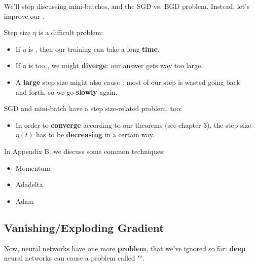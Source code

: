         We'll stop discussing mini-batches, and the SGD vs. BGD problem. Instead, let's improve our .
        
        Step size $\eta$ is a difficult problem:
        
        \begin{itemize}
            \item If $\eta$ is , then our training can take a long \textbf{time}.
            
            \item If $\eta$ is too , we might \textbf{diverge}: our answer gets way too large.
            
            \item A \textbf{large} step size might also cause : most of our step is wasted going back and forth, so we go \textbf{slowly} again.
        \end{itemize}
        
        SGD and mini-batch have a step size-related problem, too:
        
        \begin{itemize}
            \item In order to \textbf{converge} according to our theorems (see chapter 3), the step size $\eta(t)$ has to be \textbf{decreasing} in a certain way.
        \end{itemize}

        In Appendix B, we discuss some common techniques:

        \begin{itemize}
            \item Momentum
            \item Adadelta
            \item Adam
        \end{itemize}
    
    \phantom{}

    
    \pagebreak
    \subsection{Vanishing/Exploding Gradient}
    
        Now, neural networks have one more \textbf{problem}, that we've ignored so far: \textbf{deep} neural networks can cause a problem called "".
        
